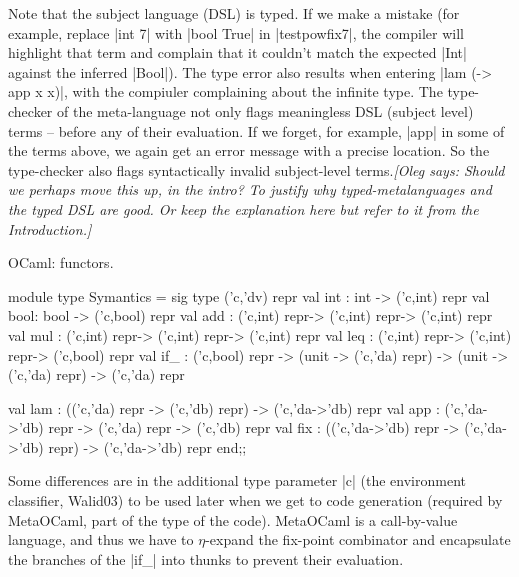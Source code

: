 \documentclass[preprint]{sigplanconf}
\newcommand{\oleg}[1]{{\it [Oleg says: #1]}}
\begin{document}
Note that the subject language (DSL) is typed. If we make a mistake
(for example, replace |int 7| with |bool True| in |testpowfix7|, the
compiler will highlight that term and complain that it couldn't match
the expected |Int| against the inferred |Bool|). The type error
also results when entering |lam (\x -> app x x)|, with the compiuler
complaining about the infinite type. The type-checker of the
meta-language not only flags meaningless DSL (subject level) terms --
before any of their evaluation. If we forget, for example, |app| in
some of the terms above, we again get an error message with a precise
location. So the type-checker also flags syntactically invalid
subject-level terms.\oleg{Should we perhaps move this up, in the
  intro? To justify why typed-metalanguages and the typed DSL are
  good. Or keep the explanation here but refer to it from the Introduction.}



OCaml: functors.

\begin{code}
module type Symantics = sig
  type ('c,'dv) repr
  val int  : int  -> ('c,int) repr
  val bool: bool -> ('c,bool) repr
  val add : ('c,int) repr-> ('c,int) repr-> ('c,int) repr
  val mul : ('c,int) repr-> ('c,int) repr-> ('c,int) repr
  val leq : ('c,int) repr-> ('c,int) repr-> ('c,bool) repr
  val if_ : ('c,bool) repr ->
             (unit -> ('c,'da) repr) ->
             (unit -> ('c,'da) repr) -> ('c,'da) repr 

  val lam : (('c,'da) repr -> ('c,'db) repr) 
          -> ('c,'da->'db) repr
  val app : ('c,'da->'db) repr
    -> ('c,'da) repr -> ('c,'db) repr
  val fix : (('c,'da->'db) repr -> ('c,'da->'db) repr) 
            -> ('c,'da->'db) repr
end;;
\end{code}

Some differences are in the additional type parameter |c| (the
environment classifier, Walid03) to be used later when we get to code
generation (required by MetaOCaml, part of the type of the
code). MetaOCaml is a call-by-value language, and thus we have to 
$\eta$-expand
the fix-point combinator and encapsulate the branches of the |if_|
into thunks to prevent their evaluation. 
\end{document}
